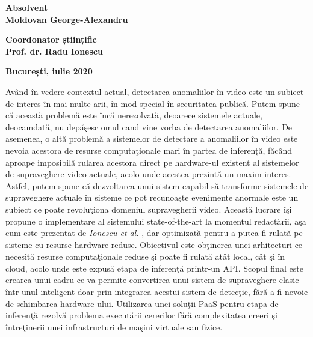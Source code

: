 \documentclass[a4paper,12pt]{report}
\renewenvironment{abstract}[1]
  {\bigskip\selectlanguage{#1}%
   \begin{center}\bfseries\abstractname\end{center}}
  {\par\bigskip}
\begin{document}
\begin{titlepage}
\begin{center}
        \vspace{2.5cm}
        \begin{large}
            \textbf{Absolvent}\\
            \vspace*{0.25cm}
            \textbf{Moldovan George-Alexandru}
        \end{large}
        
        \vspace{2cm}
        \begin{large}
            \textbf{Coordonator științific}\\
            \vspace*{0.25cm}
            \textbf{Prof. dr. Radu Ionescu}
        \end{large}
        
        \vspace{2.5cm}
        \begin{large}
            \textbf{București, iulie 2020}
        \end{large}
    \end{center}
\end{titlepage}
\begin{abstract}{romanian}
\par Având în vedere contextul actual, detectarea anomaliilor în video este un subiect de interes în mai multe arii, în mod special în securitatea publică. Putem spune că această problemă este încă nerezolvată, deoarece sistemele actuale, deocamdată, nu depăşesc  omul cand vine vorba de detectarea anomaliilor. De asemenea, o altă problemă a sistemelor de detectare a anomaliilor în video este nevoia acestora de resurse computaţionale mari în partea de inferență, făcând aproape imposibilă rularea acestora direct pe hardware-ul existent al sistemelor de supraveghere video actuale, acolo unde acestea prezintă un maxim interes. Astfel, putem spune că dezvoltarea unui sistem capabil să transforme sistemele de supraveghere actuale în sisteme ce pot recunoaşte evenimente anormale  este un subiect ce poate revoluţiona domeniul supravegherii video. Această lucrare îşi propune o implementare al sistemului state-of-the-art la momentul redactării, aşa cum este prezentat de \emph{Ionescu et al.} \cite{ionescu2019object}, dar optimizată pentru a putea fi rulată pe sisteme cu resurse hardware reduse. Obiectivul este obţinerea unei arhitecturi ce necesită resurse computaţionale reduse şi poate fi rulată atât local, cât şi în cloud, acolo unde este expusă etapa de inferenţă printr-un API. Scopul final este crearea unui cadru ce va permite convertirea unui sistem de supraveghere clasic într-unul inteligent doar prin integrarea acestui sistem de detecţie, fără a fi nevoie de schimbarea hardware-ului. Utilizarea unei soluţii PaaS pentru etapa de inferenţă rezolvă problema executării cererilor fără complexitatea creeri şi întreţinerii unei infrastructuri de maşini virtuale sau fizice. 
\end{abstract}
\end{document}
